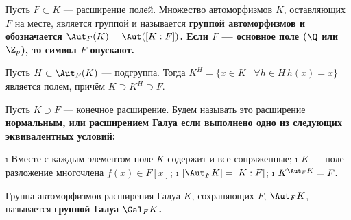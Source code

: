 \begin{defn}
Пусть \(F \subset K\) --- расширение полей. Множество автоморфизмов \(K\), оставляющих \(F\) на месте, является группой и называется \bf{группой автоморфизмов} и обозначается \(\Aut_F(K) = \Aut([K:F])\). Если \(F\) --- основное поле (\(\Q\) или \(\Z_p\)), то символ \(F\) опускают.
\end{defn}

\begin{defn}
Пусть \(H \subset \Aut_F(K)\) --- подгруппа. Тогда \(K^{H} = \{x \in K \mid \forall h \in H \, h(x)=x\}\) является полем, причём \(K \supset K^H \supset F\).
\end{defn}

\begin{defn}
Пусть \(K \supset F\) --- конечное расширение. Будем называть это расширение \bf{нормальным}, или \bf{расширением Галуа} если выполнено одно из следующих эквивалентных условий:

\begin{enumerate}
\def\labelenumi{(\arabic{enumi})}
\tightlist
\i
  Вместе с каждым элементом поле \(K\) содержит и все сопряженные;
\i
  \(K\) --- поле разложение многочлена \(f(x) \in F[x]\);
\i
  \(|\Aut_F{K}| = [K:F]\);
\i
  \(K^{\Aut_F{K}}=F\).
\end{enumerate}

\end{defn}

\begin{defn}
Группа автоморфизмов расширения Галуа \(K\), сохраняющих \(F\), \(\Aut_FK\), называется \bf{группой Галуа} \(\Gal_FK\).
\end{defn}


